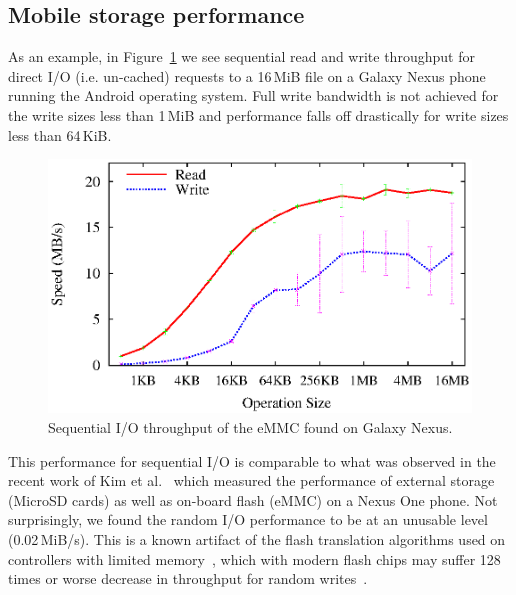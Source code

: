 \documentclass[letterpaper,twocolumn,10pt]{article}
\begin{document}
\subsection{Mobile storage performance}

As an example, in Figure~\ref{fig:galaxy-nexus-seq} we see sequential read and
write throughput for direct I/O (i.e. un-cached) requests to a 16\,MiB file on a
Galaxy Nexus phone running the Android operating system. Full write bandwidth is
not achieved for the write sizes less than 1\,MiB and performance falls off
drastically for write sizes less than 64\,KiB.

\begin{figure}[t]
  \begin{center}
    \includegraphics[width=1.04\columnwidth]{graphs/galaxy-nexus-seq}
  \end{center}
  \caption{Sequential I/O throughput of the eMMC found on Galaxy Nexus.}
  \label{fig:galaxy-nexus-seq} 
\end{figure}

This performance for sequential I/O is comparable to what was observed in the
recent work of Kim et al.~\cite{kim12} which measured the performance of
external storage (MicroSD cards) as well as on-board flash (eMMC) on a Nexus One
phone.  Not surprisingly, we found the random I/O performance to be at an
unusable level (0.02\,MiB/s).  This is a known artifact of the flash translation
algorithms used on controllers with limited memory~\cite{Kim2002:FTL}, which
with modern flash chips may suffer 128 times or worse decrease in throughput for
random writes~\cite{boboila_performance_2011}.
\end{document}
